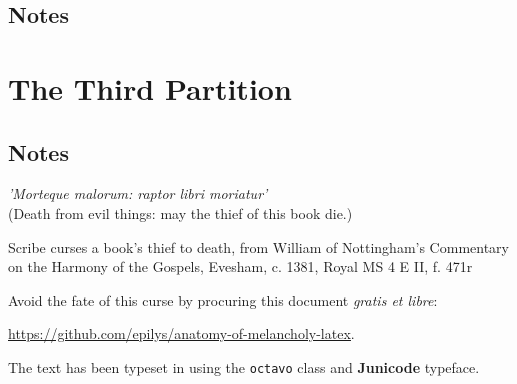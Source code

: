 \documentclass[titlepage,12pt,superroyal]{octavo}
\begin{document}
\chapter{Notes}
\part{The Third Partition}









\chapter{Notes}
\backmatter
{}
\nocite{*}
\thispagestyle{empty}
\clearpage
\thispagestyle{empty}
\colophontitlesize{18pt}
\colophonparsize{10pt}
\begin{colophon}
\epigraph{\footnotesize\textit{'Morteque malorum: raptor libri moriatur'}\\(Death from evil things: may the thief of this book die.)}{\scriptsize{}Scribe curses a book’s thief to death, from William of Nottingham’s Commentary on the Harmony of the Gospels, Evesham, c. 1381, Royal MS 4 E II, f. 471r}
Avoid the fate of this curse by procuring this document \emph{gratis et libre}:

  \href{https://github.com/epilys/anatomy-of-melancholy-latex}{\underline{https://github.com/epilys/anatomy-of-melancholy-latex}}.

  The text has been typeset in \XeLaTeX{} using the \texttt{octavo} class and \textbf{Junicode} typeface.
\end{colophon}
\clearpage{}
 \label{backcover}
\end{document}
